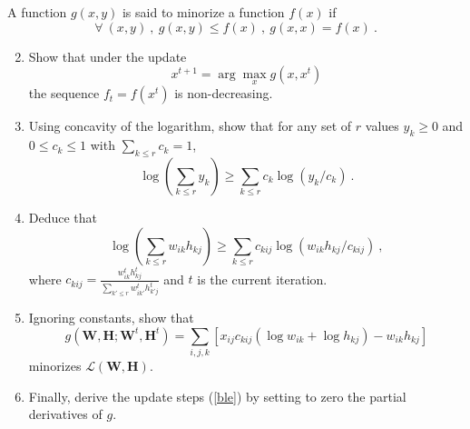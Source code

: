 \documentclass{article}
\begin{document}
\begin{enumerate}
A function $g(x,y)$ is said to minorize a function $f(x)$ if 
$$\forall~(x,y)~,~g(x,y) \leq f(x)~,~g(x,x) = f(x)~.$$
\begin{enumerate}
\setcounter{enumi}{1}
\item Show that under the update 
$$x^{t+1} = \arg\max_x g(x,x^t)$$
the sequence $f_t = f(x^t)$ is non-decreasing. 
\item Using concavity of the logarithm, show that for any set of $r$ values $y_k \geq 0$ 
and $0 \leq c_k \leq 1$ with $\sum_{k \leq r} c_k = 1$, 
$$\log \left( \sum_{k \leq r} y_k \right) \geq \sum_{k \leq r} c_k \log( y_k / c_k)~.$$
\item Deduce that 
$$\log \left( \sum_{k \leq r} w_{ik} h_{kj} \right) \geq \sum_{k \leq r} c_{kij} \log( w_{ik} h_{kj} / c_{kij})~,$$
where $c_{kij} = \frac{w_{ik}^t h_{kj}^t}{ \sum_{k' \leq r} w_{ik'}^t h_{k'j}^t} $ and $t$ is the current iteration.
\item Ignoring constants, show that 
$$g(\mathbf{W}, \mathbf{H}; \mathbf{W}^t, \mathbf{H}^t) = \sum_{i,j,k} [x_{ij} c_{kij} (\log w_{ik} + \log h_{kj}) - w_{ik}h_{kj} ]$$
minorizes $\mathcal{L}(\mathbf{W}, \mathbf{H})$. 
\item Finally, derive the update steps (\ref{ble}) by setting to zero the partial derivatives of $g$.
\end{enumerate}


\end{enumerate}
\end{document}
